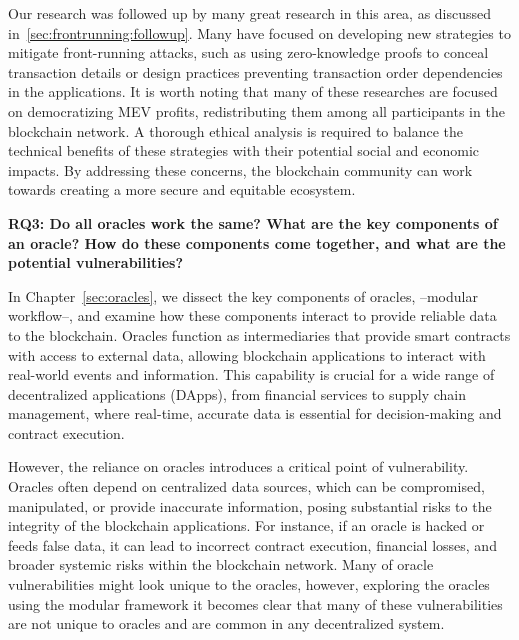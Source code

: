 Our research was followed up by many great research in this area, as discussed in~\ref{sec:frontrunning:followup}. Many have focused on developing new strategies to mitigate front-running attacks, such as using zero-knowledge proofs to conceal transaction details or design practices preventing transaction order dependencies in the applications. It is worth noting that many of these researches are focused on democratizing MEV profits, redistributing them among all participants in the blockchain network. A thorough ethical analysis is required to balance the technical benefits of these strategies with their potential social and economic impacts. By addressing these concerns, the blockchain community can work towards creating a more secure and equitable ecosystem.


\textbf{RQ3: Do all oracles work the same? What are the key components of an oracle? How do these components come together, and what are the potential vulnerabilities?}

In Chapter~\ref{sec:oracles}, we dissect the key components of oracles, --modular workflow--, and examine how these components interact to provide reliable data to the blockchain. Oracles function as intermediaries that provide smart contracts with access to external data, allowing blockchain applications to interact with real-world events and information. This capability is crucial for a wide range of decentralized applications (DApps), from financial services to supply chain management, where real-time, accurate data is essential for decision-making and contract execution. 

However, the reliance on oracles introduces a critical point of vulnerability. Oracles often depend on centralized data sources, which can be compromised, manipulated, or provide inaccurate information, posing substantial risks to the integrity of the blockchain applications. For instance, if an oracle is hacked or feeds false data, it can lead to incorrect contract execution, financial losses, and broader systemic risks within the blockchain network. Many of oracle vulnerabilities might look unique to the oracles, however, exploring the oracles using the modular framework it becomes clear that many of these vulnerabilities are not unique to oracles and are common in any decentralized system.

